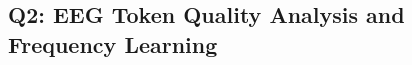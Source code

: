 



 










\subsection{Q2: EEG Token Quality Analysis and Frequency Learning}
\label{sec:token_quality_analysis}

